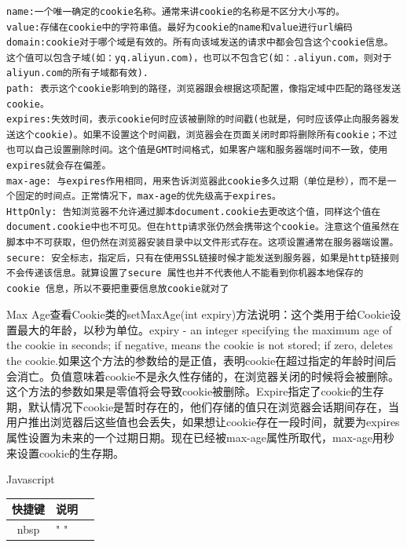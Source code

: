 \documentclass[12pt]{book}
\makeatletter
\numberwithin{dummy}{section}
\theoremstyle{ocrenumbox}
\theoremstyle{blacknumex}
\theoremstyle{blacknumbox}
\theoremstyle{ocrenum}
\renewcommand{\section}{\@startsection{section}{1}{\z@}
	{-4ex \@plus -1ex \@minus -.4ex}
	{1ex \@plus.2ex }
	{\normalfont\large\sffamily\bfseries}}
\renewcommand\paragraph{\@startsection{paragraph}{4}{\z@}
	{-2ex \@plus-.2ex \@minus .2ex}
	{.1ex}
	{\normalfont\small\sffamily\bfseries}}
\makeatother
\begin{document}
\begin{lstlisting}
name:一个唯一确定的cookie名称。通常来讲cookie的名称是不区分大小写的。
value:存储在cookie中的字符串值。最好为cookie的name和value进行url编码
domain:cookie对于哪个域是有效的。所有向该域发送的请求中都会包含这个cookie信息。这个值可以包含子域(如：yq.aliyun.com)，也可以不包含它(如：.aliyun.com，则对于aliyun.com的所有子域都有效).
path: 表示这个cookie影响到的路径，浏览器跟会根据这项配置，像指定域中匹配的路径发送cookie。
expires:失效时间，表示cookie何时应该被删除的时间戳(也就是，何时应该停止向服务器发送这个cookie)。如果不设置这个时间戳，浏览器会在页面关闭时即将删除所有cookie；不过也可以自己设置删除时间。这个值是GMT时间格式，如果客户端和服务器端时间不一致，使用expires就会存在偏差。
max-age: 与expires作用相同，用来告诉浏览器此cookie多久过期（单位是秒），而不是一个固定的时间点。正常情况下，max-age的优先级高于expires。
HttpOnly: 告知浏览器不允许通过脚本document.cookie去更改这个值，同样这个值在document.cookie中也不可见。但在http请求张仍然会携带这个cookie。注意这个值虽然在脚本中不可获取，但仍然在浏览器安装目录中以文件形式存在。这项设置通常在服务器端设置。
secure: 安全标志，指定后，只有在使用SSL链接时候才能发送到服务器，如果是http链接则不会传递该信息。就算设置了secure 属性也并不代表他人不能看到你机器本地保存的 cookie 信息，所以不要把重要信息放cookie就对了
\end{lstlisting}

\paragraph{Max Age}查看Cookie类的setMaxAge(int expiry)方法说明：这个类用于给Cookie设置最大的年龄，以秒为单位。expiry - an integer specifying the maximum age of the cookie in seconds; if negative, means the cookie is not stored; if zero, deletes the cookie.如果这个方法的参数给的是正值，表明cookie在超过指定的年龄时间后会消亡。负值意味着cookie不是永久性存储的，在浏览器关闭的时候将会被删除。这个方法的参数如果是零值将会导致cookie被删除。Expire指定了cookie的生存期，默认情况下cookie是暂时存在的，他们存储的值只在浏览器会话期间存在，当用户推出浏览器后这些值也会丢失，如果想让cookie存在一段时间，就要为expires属性设置为未来的一个过期日期。现在已经被max-age属性所取代，max-age用秒来设置cookie的生存期。

\section{Javascript}

\begin{tabular}{cp{8cm}c}
	\hline
	\multirow{1}{*}{快捷键}
	& \multicolumn{1}{c}{说明}  \\
	\hline			
	nbsp & " " \\
	\hline
\end{tabular}
\end{document}
